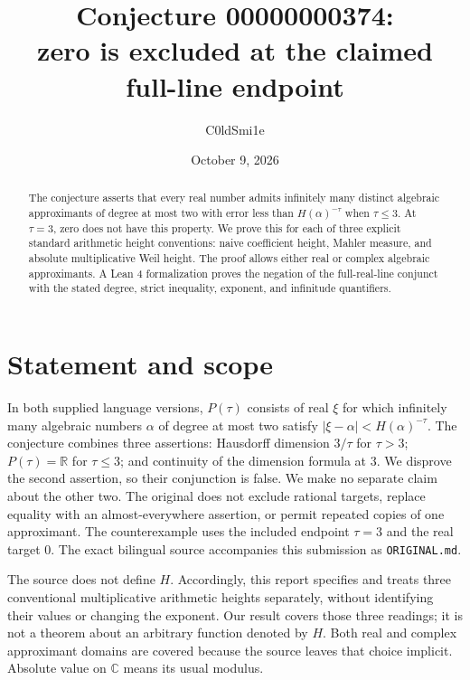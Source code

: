 \documentclass[11pt]{article}
\title{Conjecture 00000000374:\\zero is excluded at the claimed full-line endpoint}
\author{C0ldSmi1e}
\date{October 9, 2026}
\newcommand{\R}{\mathbb R}
\newcommand{\C}{\mathbb C}
\newcommand{\code}[1]{\nolinkurl{#1}}
\begin{document}
\maketitle
\begin{abstract}
The conjecture asserts that every real number admits infinitely many distinct
algebraic approximants of degree at most two with error less than
$H(\alpha)^{-\tau}$ when $\tau\leq3$. At $\tau=3$, zero does not have this property.
We prove this for each of three explicit standard arithmetic height conventions:
naive coefficient height, Mahler measure, and absolute multiplicative Weil
height. The proof allows either real or complex algebraic approximants.
A Lean 4 formalization proves the negation of the full-real-line conjunct with
the stated degree, strict inequality, exponent, and infinitude quantifiers.
\end{abstract}

\section{Statement and scope}
In both supplied language versions, $P(\tau)$ consists of real $\xi$ for which
infinitely many algebraic numbers $\alpha$ of degree at most two satisfy
$|\xi-\alpha|<H(\alpha)^{-\tau}$. The conjecture combines three assertions:
Hausdorff dimension $3/\tau$ for $\tau>3$; $P(\tau)=\R$ for $\tau\leq3$;
and continuity of the dimension formula at $3$. We disprove the second assertion,
so their conjunction is false. We make no separate claim about the other two.
The original does not exclude rational targets, replace equality with an
almost-everywhere assertion, or permit repeated copies of one approximant.
The counterexample uses the included endpoint $\tau=3$ and the real target $0$.
The exact bilingual source accompanies this submission as \code{ORIGINAL.md}.

The source does not define $H$. Accordingly, this report specifies and treats
three conventional multiplicative arithmetic heights separately, without
identifying their values or changing the exponent. Our result covers those
three readings; it is not a theorem about an arbitrary function denoted by $H$.
Both real and complex approximant domains are covered because the source leaves
that choice implicit. Absolute value on $\C$ means its usual modulus.
\end{document}

